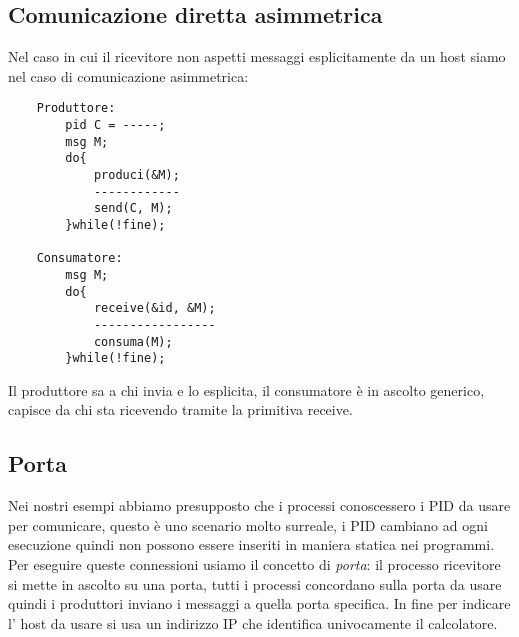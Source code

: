 \subsection{Comunicazione diretta asimmetrica}
Nel caso in cui il ricevitore non aspetti messaggi esplicitamente da un host siamo nel caso di comunicazione asimmetrica:
\begin{verbatim}
    Produttore:
        pid C = -----;
        msg M;
        do{
            produci(&M);
            ------------
            send(C, M);
        }while(!fine);
    
    Consumatore:
        msg M;
        do{
            receive(&id, &M);
            -----------------
            consuma(M);
        }while(!fine);
\end{verbatim}
Il produttore sa a chi invia e lo esplicita, il consumatore è in ascolto generico, capisce da chi sta ricevendo tramite la primitiva receive.

\subsection{Porta}
Nei nostri esempi abbiamo presupposto che i processi conoscessero i PID da usare per comunicare, questo è uno scenario molto surreale, i PID cambiano ad ogni esecuzione quindi non possono essere inseriti in maniera statica nei programmi.
Per eseguire queste connessioni usiamo il concetto di \emph{porta}: il processo ricevitore si mette in ascolto su una porta, tutti i processi concordano sulla porta da usare quindi i produttori inviano i messaggi a quella porta specifica.
In fine per indicare l' host da usare si usa un indirizzo IP che identifica univocamente il calcolatore.





